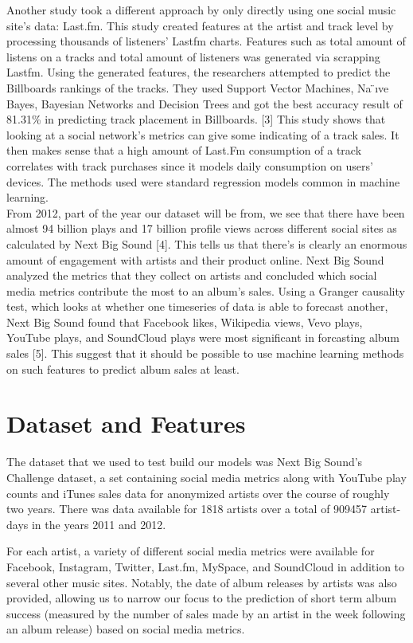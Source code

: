\documentclass[conference]{IEEEtran}
\begin{document}
Another study took a different approach by only directly using one social music site's data: Last.fm. This study created features at the artist and track level by processing thousands of listeners' Lastfm charts. Features such as total amount of listens on a tracks and total amount of listeners was generated via scrapping Lastfm. Using the generated features, the researchers attempted to predict the Billboards rankings of the tracks. They used Support Vector Machines, Na ̈ıve Bayes, Bayesian Networks and Decision Trees and got the best accuracy result of 81.31\% in predicting track placement in Billboards. [3] This study shows that looking at a social network's metrics can give some indicating of a track sales. It then makes sense that a high amount of Last.Fm consumption of a track correlates with track purchases since it models daily consumption on users' devices. The methods used were standard regression models common in machine learning.\\

From 2012, part of the year our dataset will be from, we see that there have been almost 94 billion plays and 17 billion profile views across different social sites as calculated by Next Big Sound [4]. This tells us that there's is clearly an enormous amount of engagement with artists and their product online. Next Big Sound analyzed the metrics that they collect on artists and concluded which social media metrics contribute the most to an album's sales. Using a  Granger causality test, which looks at whether one timeseries of data is able to forecast another, Next Big Sound found that Facebook likes, Wikipedia views, Vevo plays, YouTube plays, and SoundCloud plays were most significant in forcasting album sales [5]. This suggest that it should be possible to use machine learning methods on such features to predict album sales at least.


\section{Dataset and Features}
The dataset that we used to test build our models was Next Big Sound's Challenge dataset, a set containing social media metrics along with YouTube play counts and iTunes sales data for anonymized artists over the course of roughly two years. There was data available for 1818 artists over a total of 909457 artist-days in the years 2011 and 2012.

For each artist, a variety of different social media metrics were available for Facebook, Instagram, Twitter, Last.fm, MySpace, and SoundCloud in addition to several other music sites. Notably, the date of album releases by artists was also provided, allowing us to narrow our focus to the prediction of short term album success (measured by the number of sales made by an artist in the week following an album release) based on social media metrics.
\end{document}
